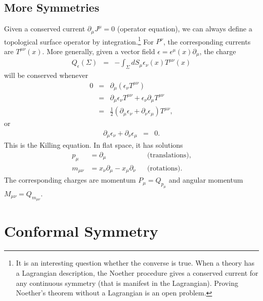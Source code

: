 \documentclass[11pt]{ws-rv9x6}
\newcommand\be{\begin{eqnarray}}
\newcommand\ee{\end{eqnarray}}
\newcommand\ptl\partial
\newcommand\e\epsilon
\newcommand\<\langle
\renewcommand\>\rangle
\newcommand\nn{\nonumber}
\renewcommand\.{\cdot}
\begin{document}
\subsection{More Symmetries}

Given a conserved current $\ptl_\mu J^\mu=0$ (operator equation), we can always define a topological surface operator by integration.\footnote{It is an interesting question whether the converse is true. When a theory has a Lagrangian description, the Noether procedure gives a conserved current for any continuous symmetry (that is manifest in the Lagrangian).  Proving Noether's theorem without a Lagrangian is an open problem.} For $P^\nu$, the corresponding currents are $T^{\mu\nu}(x)$.  More generally, given a vector field $\e=\e^\mu(x)\ptl_\mu$, the charge
\be
Q_\e(\Sigma) &=& -\int_\Sigma dS_\mu \e_\nu(x) T^{\mu\nu}(x)
\ee
will be conserved whenever
\be
0&=&\ptl_\mu(\e_\nu T^{\mu\nu}) \nn\\
&=&
 \ptl_\mu \e_\nu T^{\mu\nu}+\e_\nu \ptl_\mu T^{\mu\nu}\nn\\
&=& \frac 1 2(\ptl_\mu \e_\nu+\ptl_\nu \e_\mu) T^{\mu\nu},
\ee
or
\be
\label{eq:killingvector}
\ptl_\mu\e_\nu+\ptl_\nu\e_\mu &=& 0.
\ee
This is the Killing equation. In flat space, it has solutions
\begin{align}
\label{eq:poincaregenerators}
p_\mu &= \ptl_\mu &&\textrm{(translations)},\nn\\
m_{\mu\nu} &= x_\nu\ptl_\mu - x_\mu\ptl_\nu && \textrm{(rotations)}.
\end{align}
The corresponding charges
are momentum $P_\mu=Q_{p_\mu}$ and angular momentum $M_{\mu\nu}=Q_{m_{\mu\nu}}$.

\section{Conformal Symmetry}
\end{document}
